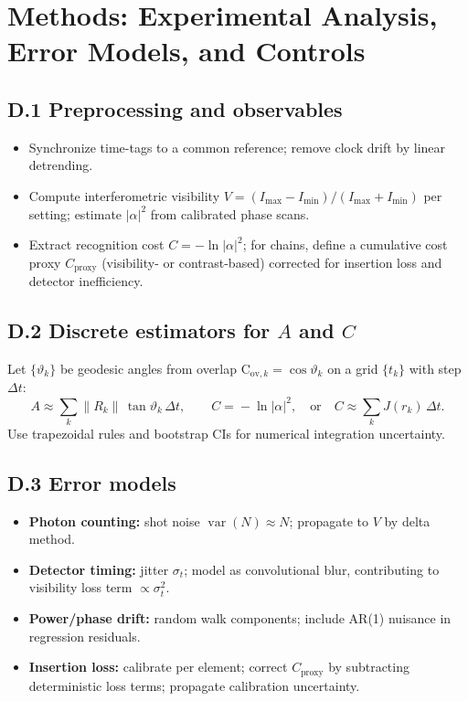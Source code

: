 \documentclass[12pt,a4paper]{article}
\begin{document}
\section{Methods: Experimental Analysis, Error Models, and Controls}\label{app:analysis}

\subsection*{D.1 Preprocessing and observables}
\begin{itemize}
  \item Synchronize time-tags to a common reference; remove clock drift by linear detrending.
  \item Compute interferometric visibility $V=(I_{\max}-I_{\min})/(I_{\max}+I_{\min})$ per setting; estimate $|\alpha|^{2}$ from calibrated phase scans.
  \item Extract recognition cost $C=-\ln|\alpha|^{2}$; for chains, define a cumulative cost proxy $C_{\mathrm{proxy}}$ (visibility- or contrast-based) corrected for insertion loss and detector inefficiency.
\end{itemize}

\subsection*{D.2 Discrete estimators for $A$ and $C$}
Let $\{\vartheta_k\}$ be geodesic angles from overlap $\mathrm{C}_{\mathrm{ov},k}=\cos\vartheta_k$ on a grid $\{t_k\}$ with step $\Delta t$:
\[
A \approx \sum_k \bigl\|R_k\bigr\|\,\tan\vartheta_k\,\Delta t,\qquad
C=\!-\ln|\alpha|^{2},\quad\text{or}\quad
C \approx \sum_k J(r_k)\,\Delta t.
\]
Use trapezoidal rules and bootstrap CIs for numerical integration uncertainty.

\subsection*{D.3 Error models}
\begin{itemize}
  \item \textbf{Photon counting:} shot noise $\operatorname{var}(N)\approx N$; propagate to $V$ by delta method.
  \item \textbf{Detector timing:} jitter $\sigma_{t}$; model as convolutional blur, contributing to visibility loss term $\propto \sigma_{t}^{2}$.
  \item \textbf{Power/phase drift:} random walk components; include AR(1) nuisance in regression residuals.
  \item \textbf{Insertion loss:} calibrate per element; correct $C_{\mathrm{proxy}}$ by subtracting deterministic loss terms; propagate calibration uncertainty.
\end{itemize}
\end{document}
